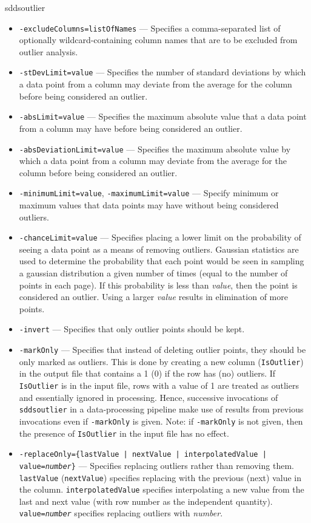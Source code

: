 \begin{sddsprog}{sddsoutlier}
\begin{itemize}
      \item \verb|-excludeColumns=listOfNames| --- Specifies a comma-separated list of optionally wildcard-containing column names that are to be excluded from outlier analysis.
      \item \verb|-stDevLimit=value| --- Specifies the number of standard deviations by which a data point from a column may deviate from the average for the column before being considered an outlier.
      \item \verb|-absLimit=value| --- Specifies the maximum absolute value that a data point from a column may have before being considered an outlier.
      \item \verb|-absDeviationLimit=value| --- Specifies the maximum absolute value by which a data point from a column may deviate from the average for the column before being considered an outlier.
      \item \verb|-minimumLimit=value|, \verb|-maximumLimit=value| --- Specify minimum or maximum values that data points may have without being considered outliers.
      \item \verb|-chanceLimit=value| --- Specifies placing a lower limit on the probability of seeing a data point as a means of removing outliers. Gaussian statistics are used to determine the probability that each point would be seen in sampling a gaussian distribution a given number of times (equal to the number of points in each page). If this probability is less than \emph{value}, then the point is considered an outlier. Using a larger \emph{value} results in elimination of more points.
      \item \verb|-invert| --- Specifies that only outlier points should be kept.
      \item \verb|-markOnly| --- Specifies that instead of deleting outlier points, they should be only marked as outliers. This is done by creating a new column (\verb|IsOutlier|) in the output file that contains a 1 (0) if the row has (no) outliers. If \verb|IsOutlier| is in the input file, rows with a value of 1 are treated as outliers and essentially ignored in processing. Hence, successive invocations of \verb|sddsoutlier| in a data-processing pipeline make use of results from previous invocations even if \verb|-markOnly| is given. Note: if \verb|-markOnly| is not given, then the presence of \verb|IsOutlier| in the input file has no effect.
      \item {\tt -replaceOnly=\{lastValue | nextValue | interpolatedValue | value={\em number}\}} --- Specifies replacing outliers rather than removing them. {\tt lastValue} ({\tt nextValue}) specifies replacing with the previous (next) value in the column. {\tt interpolatedValue} specifies interpolating a new value from the last and next value (with row number as the independent quantity). {\tt value={\em number}} specifies replacing outliers with \emph{number}.

\end{itemize}
\end{sddsprog}
